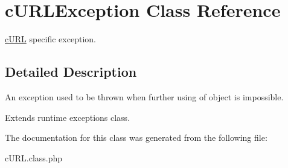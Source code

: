 \hypertarget{a00003}{
\section{cURLException Class Reference}
\label{a00003}
}


\hyperlink{a00002}{cURL} specific exception.  




\subsection{Detailed Description}
An exception used to be thrown when further using of object is impossible.

Extends runtime exceptions class. 

The documentation for this class was generated from the following file:\begin{DoxyCompactItemize}
\item 
cURL.class.php\end{DoxyCompactItemize}
